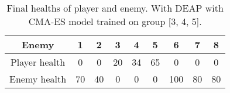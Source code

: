 \begin{table}[ht]\centering
\begin{tabular}{|c|c|c|c|c|c|c|c|c|}
\hline
Enemy & 1 & 2 & 3 & 4 & 5 & 6 & 7 & 8\\
\hline
Player health & 0 & 0 & 20 & 34 & 65 & 0 & 0 & 0\\
\hline
Enemy health & 70 & 40 & 0 & 0 & 0 & 100 & 80 & 80\\
\hline
\end{tabular}
\caption{Final healths of player and enemy. With DEAP with CMA-ES  model trained on group [3, 4, 5].}
\label{tab:test_DEAP_3_4_5}
\end{table}